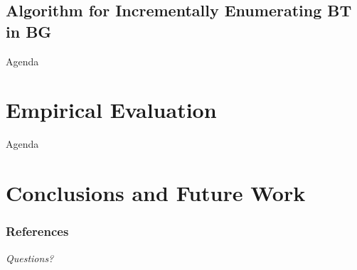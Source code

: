 \documentclass{beamer}
\begin{document}
  \subsection{Algorithm for Incrementally Enumerating BT in BG}
  

  \begin{frame}{Agenda}
    \section{Empirical Evaluation}
  \end{frame}

  

  \begin{frame}{Agenda}
    \section{Conclusions and Future Work}
  \end{frame}

  

  \begin{frame}[allowframebreaks]
    \frametitle{References}
    
    
  \end{frame}

  \begin{frame}
    \centering \Huge
    \emph{Questions?}
  \end{frame}  
  
  \iffalse
  
  \fi

  
\end{document}
